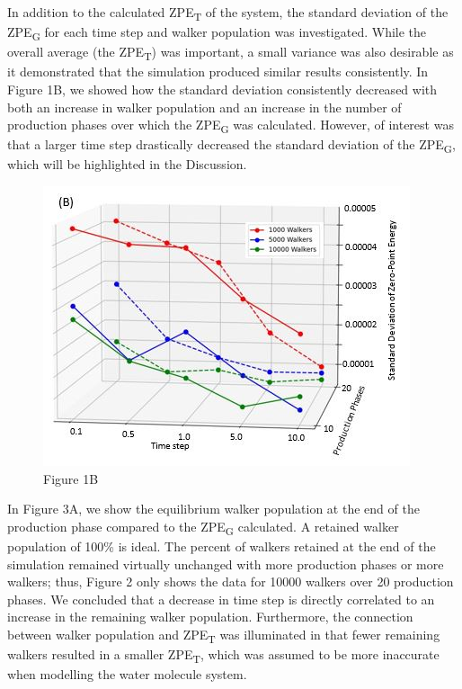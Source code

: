 \documentclass[journal=jacsat,manuscript=article]{achemso}
\begin{document}
In addition to the calculated ZPE\textsubscript{T} of the system, the standard deviation of the ZPE\textsubscript{G} for each time step and walker population was investigated. While the overall average (the ZPE\textsubscript{T}) was important, a small variance was also desirable as it demonstrated that the simulation produced similar results consistently. In Figure 1B, we showed how the standard deviation consistently decreased with both an increase in walker population and an increase in the number of production phases over which the ZPE\textsubscript{G} was calculated. However, of interest was that a larger time step drastically decreased the standard deviation of the ZPE\textsubscript{G}, which will be highlighted in the Discussion. 

\begin{figure}[H]
  \includegraphics[width=\linewidth]{fig_1B.jpg}
  \caption{Figure 1B}
  \label{fig:}
\end{figure}

In Figure 3A, we show the equilibrium walker population at the end of the production phase compared to the ZPE\textsubscript{G} calculated. A retained walker population of 100\% is ideal. The percent of walkers retained at the end of the simulation remained virtually unchanged with more production phases or more walkers; thus, Figure 2 only shows the data for 10000 walkers over 20 production phases. We concluded that a decrease in time step is directly correlated to an increase in the remaining walker population. Furthermore, the connection between walker population and ZPE\textsubscript{T} was illuminated in that fewer remaining walkers resulted in a smaller ZPE\textsubscript{T}, which was assumed to be more inaccurate when modelling the water molecule system. 
\end{document}
